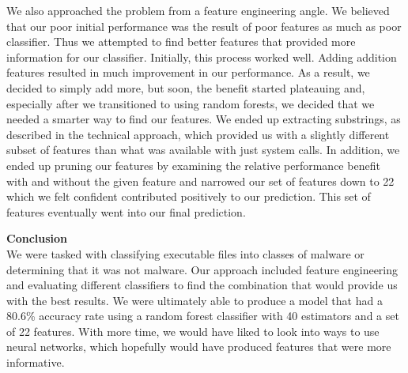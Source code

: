 \documentclass[12pt]{article}
\begin{document}
We also approached the problem from a feature engineering angle. We believed that our poor initial performance was the result of poor features as much as poor classifier. Thus we attempted to find better features that provided more information for our classifier. Initially, this process worked well. Adding addition features resulted in much improvement in our performance. As a result, we decided to simply add more, but soon, the benefit started plateauing and, especially after we transitioned to using random forests, we decided that we needed a smarter way to find our features. We ended up extracting substrings, as described in the technical approach, which provided us with a slightly different subset of features than what was available with just system calls. In addition, we ended up pruning our features by examining the relative performance benefit with and without the given feature and narrowed our set of features down to 22 which we felt confident contributed positively to our prediction. This set of features eventually went into our final prediction. \\

\bigskip

\textbf{Conclusion} \\
We were tasked with classifying executable files into classes of malware or determining that it was not malware. Our approach included feature engineering and evaluating different classifiers to find the combination that would provide us with the best results. We were ultimately able to produce a model that had a 80.6\% accuracy rate using a random forest classifier with 40 estimators and a set of 22 features. With more time, we would have liked to look into ways to use neural networks, which hopefully would have produced features that were more informative. 
\end{document}
